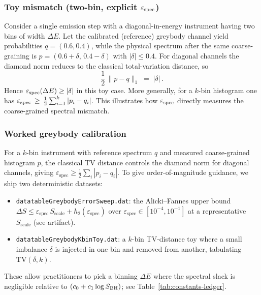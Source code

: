\documentclass[11pt,a4paper]{article}
\theoremstyle{plain}
\theoremstyle{definition}
\theoremstyle{remark}
\begin{document}
\subsubsection{Toy mismatch (two-bin, explicit $\varepsilon_{\rm spec}$)}
Consider a single emission step with a diagonal-in-energy instrument having two bins of width $\Delta E$. Let the calibrated (reference) greybody channel yield probabilities $q=(0.6,0.4)$, while the physical spectrum after the same coarse-graining is $p=(0.6+\delta,\,0.4-\delta)$ with $|\delta|\le 0.4$. For diagonal channels the diamond norm reduces to the classical total-variation distance, so
\[
	\frac{1}{2}\,\|p-q\|_1\;=\;|\delta|\,.
\]
Hence $\varepsilon_{\rm spec}(\Delta E)\ge |\delta|$ in this toy case. More generally, for a $k$-bin histogram one has $\varepsilon_{\rm spec}\,\ge\,\tfrac12\sum_{i=1}^k |p_i-q_i|$. This illustrates how $\varepsilon_{\rm spec}$ directly measures the coarse-grained spectral mismatch.

\subsubsection{Worked greybody calibration}
For a $k$-bin instrument with reference spectrum $q$ and measured coarse-grained
histogram $p$, the classical TV distance controls the diamond norm for diagonal
channels, giving \(\varepsilon_{\mathrm{spec}} \ge \frac12\sum_i |p_i-q_i|\).
To give order-of-magnitude guidance, we ship two deterministic datasets:
\begin{itemize}
  \item \texttt{datatableGreybodyErrorSweep.dat}: the Alicki–Fannes upper bound
        \(\Delta S \le \varepsilon_{\mathrm{spec}}\,S_{\mathrm{scale}} + h_2(\varepsilon_{\mathrm{spec}})\)
        over \(\varepsilon_{\mathrm{spec}}\in[10^{-4},10^{-1}]\) at a representative
        \(S_{\mathrm{scale}}\) (see artifact).
  \item \texttt{datatableGreybodyKbinToy.dat}: a $k$-bin TV-distance toy where a small
        imbalance $\delta$ is injected in one bin and removed from another, tabulating
        \(\mathrm{TV}(\delta,k)\).
\end{itemize}
These allow practitioners to pick a binning \(\Delta E\) where the spectral slack is
negligible relative to $(c_0+c_1\log S_{\rm BH})$; see Table~\ref{tab:constants-ledger}.
\end{document}
